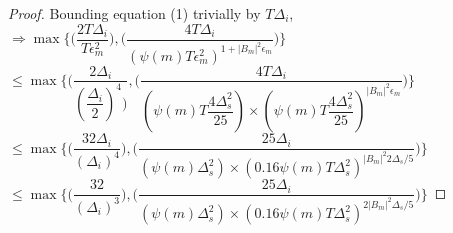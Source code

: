 \begin{proof}
Bounding equation (1) trivially by  $T\Delta_{i}$,
\newline\newline
$\Rightarrow \max{\bigg\lbrace \bigg(\dfrac{2T\Delta_{i}}{T\epsilon_{m}^{2}}\bigg) ,\bigg(\dfrac{4T\Delta_{i}}{(\psi(m)T\epsilon_{m}^{2})^{1+|B_{m}|^{2}\epsilon_{m}}}\bigg)\bigg\rbrace}$
\newline
$\leq \max{\bigg\lbrace \bigg(\dfrac{2\Delta_{i}}{(\dfrac{\Delta_{i}}{2})^{4}\bigg)} ,\bigg(\dfrac{4T\Delta_{i}}{(\psi(m)T\dfrac{4\Delta_{s}^{2}}{25})\times(\psi(m)T\dfrac{4\Delta_{s}^{2}}{25})^{|B_{m}|^{2}\epsilon_{m}}}\bigg)\bigg\rbrace}$
\newline
$\leq \max{\bigg\lbrace \bigg(\dfrac{32\Delta_{i}}{(\Delta_{i})^{4}}\bigg) ,\bigg(\dfrac{25\Delta_{i}}{(\psi(m)\Delta_{s}^{2})\times(0.16\psi(m)T\Delta_{s}^{2})^{|B_{m}|^{2}2\Delta_{s}/5}}\bigg)\bigg\rbrace}$
\newline
$\leq \max{\bigg\lbrace \bigg(\dfrac{32}{(\Delta_{i})^{3}}\bigg) ,\bigg(\dfrac{25\Delta_{i}}{(\psi(m)\Delta_{s}^{2})\times(0.16\psi(m)T\Delta_{s}^{2})^{2|B_{m}|^{2}\Delta_{s}/5}}\bigg)\bigg\rbrace}$

\end{proof}
